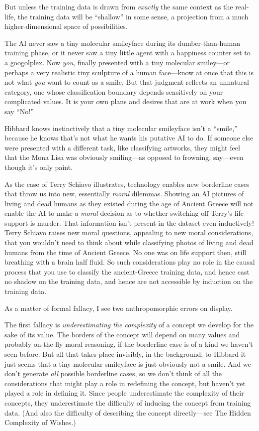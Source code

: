 {
 But unless the training data is drawn from \textit{exactly} the
same context as the real-life, the training data will be
``shallow'' in some sense, a
projection from a much higher-dimensional space of possibilities.}

{
 The AI never saw a tiny molecular smileyface during its
dumber-than-human training phase, or it never saw a tiny little agent
with a happiness counter set to a googolplex. Now \textit{you}, finally
presented with a tiny molecular smiley---or perhaps a very realistic
tiny sculpture of a human face---know at once that this is not what
\textit{you} want to count as a smile. But that judgment reflects an
unnatural category, one whose classification boundary depends
sensitively on your complicated values. It is your own plans and
desires that are at work when you say
``No!''}

{
 Hibbard knows instinctively that a tiny molecular smileyface
isn't a ``smile,''
because he knows that's not what he wants his putative
AI to do. If someone else were presented with a different task, like
classifying artworks, they might feel that the Mona Lisa was obviously
smiling---as opposed to frowning, say---even though
it's only paint.}

{
 As the case of Terry Schiavo illustrates, technology enables new
borderline cases that throw us into new, essentially \textit{moral}
dilemmas. Showing an AI pictures of living and dead humans as they
existed during the age of Ancient Greece will not enable the AI to make
a \textit{moral} decision as to whether switching off
Terry's life support is murder. That information
isn't present in the dataset even inductively! Terry
Schiavo raises new moral questions, appealing to new moral
considerations, that you wouldn't need to think about
while classifying photos of living and dead humans from the time of
Ancient Greece. No one was on life support then, still breathing with a
brain half fluid. So such considerations play no role in the causal
process that you use to classify the ancient-Greece training data, and
hence cast no shadow on the training data, and hence are not accessible
by induction on the training data.}

{
 As a matter of formal fallacy, I see two anthropomorphic errors on
display.}

{
 The first fallacy is \textit{underestimating the complexity} of a
concept we develop for the sake of its value. The borders of the
concept will depend on many values and probably on-the-fly moral
reasoning, if the borderline case is of a kind we
haven't seen before. But all that takes place
invisibly, in the background; to Hibbard it just seems that a tiny
molecular smileyface is just obviously not a smile. And we
don't generate \textit{all} possible borderline cases,
so we don't think of all the considerations that might
play a role in redefining the concept, but haven't yet
played a role in defining it. Since people underestimate the complexity
of their concepts, they underestimate the difficulty of inducing the
concept from training data. (And also the difficulty of describing the
concept directly---see The Hidden Complexity of Wishes.)}

